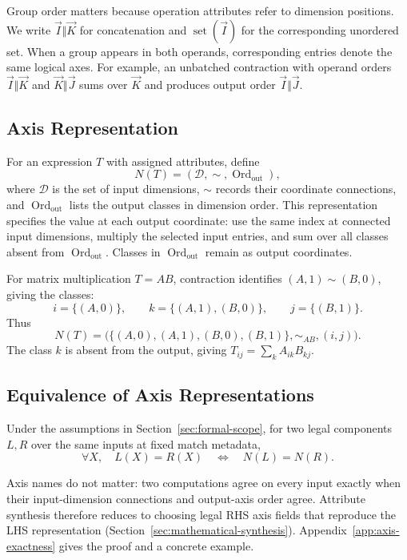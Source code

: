 Group order matters because operation attributes refer to dimension
positions. We write $\vec I\Vert\vec K$ for concatenation and
$\operatorname{set}(\vec I)$ for the corresponding unordered set. When a
group appears in both operands, corresponding entries denote the same
logical axes. For example, an unbatched contraction with operand orders
$\vec I\Vert\vec K$ and $\vec K\Vert\vec J$ sums over $\vec K$ and
produces output order $\vec I\Vert\vec J$.

\subsection{Axis Representation}
\label{sec:axis-representation}
For an expression $T$ with assigned attributes, define
\begin{equation}
 N(T)=(\mathcal D,\sim,\operatorname{Ord}_{\mathrm{out}}),
 \label{eq:axis-representation}
\end{equation}
where $\mathcal D$ is the set of input dimensions, $\sim$ records their coordinate
connections, and $\operatorname{Ord}_{\mathrm{out}}$ lists the output classes in dimension order. This representation
specifies the value at each output coordinate: use the same index at
connected input dimensions, multiply the selected input entries, and sum over
all classes absent from $\operatorname{Ord}_{\mathrm{out}}$. Classes in $\operatorname{Ord}_{\mathrm{out}}$ remain as output coordinates.

For matrix multiplication $T=AB$, contraction identifies
$(A,1)\sim(B,0)$, giving the classes:
\begin{equation}
 i=\{(A,0)\},\qquad k=\{(A,1),(B,0)\},\qquad j=\{(B,1)\}.
\end{equation}
Thus
\begin{equation}
 N(T)=\bigl(\{(A,0),(A,1),(B,0),(B,1)\},\sim_{AB},(i,j)\bigr).
\end{equation}
The class $k$ is absent from the output, giving $T_{ij}=\sum_k A_{ik}B_{kj}$.

\subsection{Equivalence of Axis Representations}
\begin{lemma}
\label{lem:axis-exactness}
Under the assumptions in Section~\ref{sec:formal-scope}, for two legal
components $L,R$ over the same inputs at fixed match metadata,
\begin{equation}
 \forall X,\quad L(X)=R(X)\quad\iff\quad N(L)=N(R).
 \label{eq:axis-exactness}
\end{equation}
\end{lemma}
Axis names do not matter: two computations agree on every input exactly when
their input-dimension connections and output-axis order agree. Attribute
synthesis therefore reduces to choosing legal RHS axis fields that reproduce
the LHS representation (Section~\ref{sec:mathematical-synthesis}).
Appendix~\ref{app:axis-exactness} gives the proof and a concrete example.
